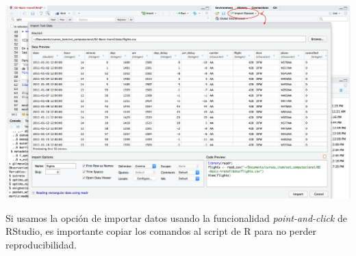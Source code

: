 \documentclass[
]{book}
\begin{document}
\includegraphics{imagenes/importar_RStudio.png}

Si usamos la opción de importar datos usando la funcionalidad \emph{point-and-click}
de RStudio, es importante copiar los comandos al script de R para no perder
reproducibilidad.
\end{document}
